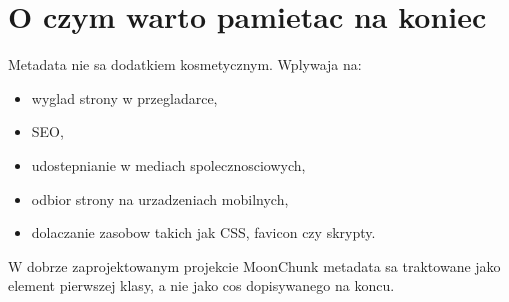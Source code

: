 \section{O czym warto pamietac na koniec}
Metadata nie sa dodatkiem kosmetycznym. Wplywaja na:

\begin{itemize}
  \item wyglad strony w przegladarce,
  \item SEO,
  \item udostepnianie w mediach spolecznosciowych,
  \item odbior strony na urzadzeniach mobilnych,
  \item dolaczanie zasobow takich jak CSS, favicon czy skrypty.
\end{itemize}

W dobrze zaprojektowanym projekcie MoonChunk metadata sa traktowane jako element
pierwszej klasy, a nie jako cos dopisywanego na koncu.
